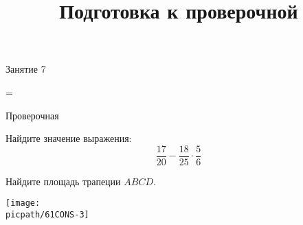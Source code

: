 \begin{class}[number=7]
	\title{Подготовка к проверочной}
	\begin{listofex}
		\item Занятие 7
	\end{listofex}
\end{class}

=%
\begin{exam}
	\begin{listofex}
		\item Проверочная
	\end{listofex}
\end{exam}

\begin{consultation}
	\begin{listofex}
		\item Найдите значение выражения: \[ \dfrac{17}{20} - \dfrac{18}{25} \cdot \dfrac{5}{6} \]
		\item
		\begin{minipage}[t]{180pt}
			Найдите площадь трапеции \( ABCD \).
		\end{minipage}
		\hspace{0.01\linewidth}
		\begin{minipage}[t]{100pt}
			\texttt{[image: \\picpath/61CONS-3]}
		\end{minipage}
		

\end{listofex}
\end{consultation}
